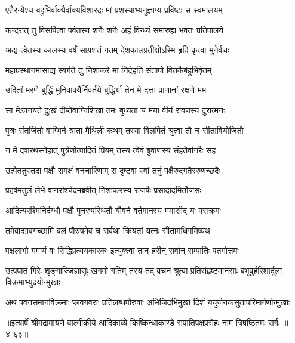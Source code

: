 
\twolineshloka
{एतैरन्यैश्च बहुभिर्वाक्यैर्वाक्यविशारदः}
{मां प्रशस्याभ्यनुज्ञाप्य प्रविष्टः स स्वमालयम्} %

\twolineshloka
{कन्दरात् तु विसर्पित्वा पर्वतस्य शनैः शनैः}
{अहं विन्ध्यं समारुह्य भवतः प्रतिपालये} %

\twolineshloka
{अद्य त्वेतस्य कालस्य वर्षं साग्रशतं गतम्}
{देशकालप्रतीक्षोऽस्मि हृदि कृत्वा मुनेर्वचः} %

\twolineshloka
{महाप्रस्थानमासाद्य स्वर्गते तु निशाकरे}
{मां निर्दहति संतापो वितर्कैर्बहुभिर्वृतम्} %

\twolineshloka
{उदितां मरणे बुद्धिं मुनिवाक्यैर्निवर्तये}
{बुद्धिर्या तेन मे दत्ता प्राणानां रक्षणे मम} %

\twolineshloka
{सा मेऽपनयते दुःखं दीप्तेवाग्निशिखा तमः}
{बुध्यता च मया वीर्यं रावणस्य दुरात्मनः} %

\twolineshloka
{पुत्रः संतर्जितो वाग्भिर्न त्राता मैथिली कथम्}
{तस्या विलपितं श्रुत्वा तौ च सीतावियोजितौ} %

\twolineshloka
{न मे दशरथस्नेहात् पुत्रेणोत्पादितं प्रियम्}
{तस्य त्वेवं ब्रुवाणस्य संहतैर्वानरैः सह} %

\twolineshloka
{उत्पेततुस्तदा पक्षौ समक्षं वनचारिणाम्}
{स दृष्ट्वा स्वां तनुं पक्षैरुद्गतैररुणच्छदैः} %

\twolineshloka
{प्रहर्षमतुलं लेभे वानरांश्चेदमब्रवीत्}
{निशाकरस्य राजर्षेः प्रसादादमितौजसः} %

\twolineshloka
{आदित्यरश्मिनिर्दग्धौ पक्षौ पुनरुपस्थितौ}
{यौवने वर्तमानस्य ममासीद् यः पराक्रमः} %

\twolineshloka
{तमेवाद्यावगच्छामि बलं पौरुषमेव च}
{सर्वथा क्रियतां यत्नः सीतामधिगमिष्यथ} %

\twolineshloka
{पक्षलाभो ममायं वः सिद्धिप्रत्ययकारकः}
{इत्युक्त्वा तान् हरीन् सर्वान् सम्पातिः पतगोत्तमः} %

\threelineshloka
{उत्पपात गिरेः शृङ्गाज्जिज्ञासुः खगमो गतिम्}
{तस्य तद् वचनं श्रुत्वा प्रतिसंहृष्टमानसाः}
{बभूवुर्हरिशार्दूला विक्रमाभ्युदयोन्मुखाः} %

\twolineshloka
{अथ पवनसमानविक्रमाः प्लवगवराः प्रतिलब्धपौरुषाः}
{अभिजिदभिमुखां दिशं ययुर्जनकसुतापरिमार्गणोन्मुखाः} %


॥इत्यार्षे श्रीमद्रामायणे वाल्मीकीये आदिकाव्ये किष्किन्धाकाण्डे संपातिपक्षप्ररोहः नाम त्रिषष्ठितमः सर्गः ॥४-६३॥
